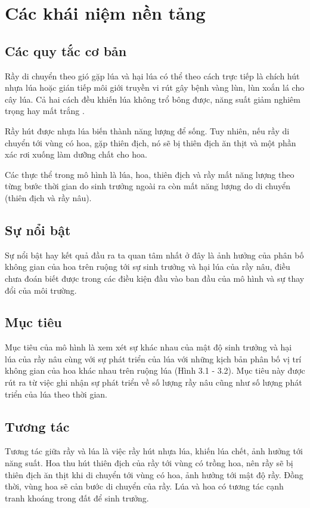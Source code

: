 \documentclass[13pt]{extreport}
\begin{document}
{\section{Các khái niệm nền tảng}
\subsection{Các quy tắc cơ bản}
\indent Rầy di chuyển theo gió gặp lúa và hại lúa có thể theo cách trực tiếp là chích hút nhựa lúa hoặc gián tiếp môi giới truyền vi rút gây bệnh vàng lùn, lùn xoắn lá cho cây lúa. Cả hai cách đều khiến lúa không trổ bông được, năng suất giảm nghiêm trọng hay mất trắng \cite{tltk9, tltk10}.

\indent Rầy hút được nhựa lúa biến thành năng lượng để sống. Tuy nhiên, nếu rầy di chuyển tới vùng có hoa, gặp thiên địch, nó sẽ bị thiên địch ăn thịt và một phần xác rơi xuống làm dưỡng chất cho hoa.

\indent Các thực thể trong mô hình là lúa, hoa, thiên địch và rầy mất năng lượng theo từng bước thời gian do sinh trưởng ngoài ra còn mất năng lượng do di chuyển (thiên địch và rầy nâu).

\subsection{Sự nổi bật}
Sự nổi bật hay kết quả đầu ra ta quan tâm nhất ở đây là ảnh hưởng của phân bố không gian của hoa trên ruộng tới sự sinh trưởng và hại lúa của rầy nâu, điều chưa đoán biết được trong các điều kiện đầu vào ban đầu của mô hình và sự thay đổi của môi trường.

\subsection{Mục tiêu}
Mục tiêu của mô hình là xem xét sự khác nhau của mật độ sinh trưởng và hại lúa của rầy nâu cùng với sự phát triển của lúa với những kịch bản phân bố vị trí không gian của hoa khác nhau trên ruộng lúa (Hình 3.1 - 3.2). Mục tiêu này được rút ra từ việc ghi nhận sự phát triển về số lượng rầy nâu cũng như số lượng phát triển của lúa theo thời gian.

\subsection{Tương tác}
Tương tác giữa rầy và lúa là việc rầy hút nhựa lúa, khiến lúa chết, ảnh hưởng tới năng suất. Hoa thu hút thiên địch của rầy tới vùng có trồng hoa, nên rầy sẽ bị thiên địch ăn thịt khi di chuyển tới vùng có hoa, ảnh hưởng tới mật độ rầy. Đồng thời, vùng hoa sẽ cản bước di chuyển của rầy. Lúa và hoa có tương tác cạnh tranh khoáng trong đất để sinh trưởng.

}
\end{document}
